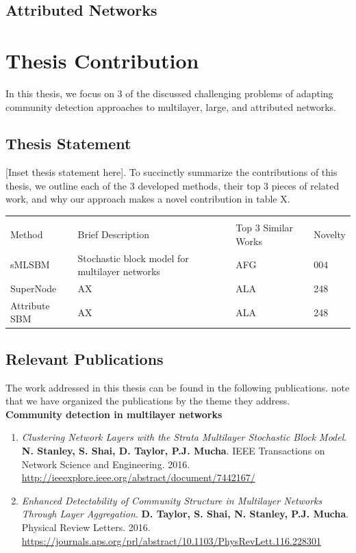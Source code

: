 \subsection{Attributed Networks}

\section{Thesis Contribution}
In this thesis, we focus on 3 of the discussed challenging problems of adapting community detection approaches to multilayer, large, and attributed networks. 

\subsection{Thesis Statement}

[Inset thesis statement here]. To succinctly summarize the contributions of this thesis, we outline each of the 3 developed methods, their top 3 pieces of related work, and why our approach makes a novel contribution in table X. 

\begin{tabular}{ p{3cm}||p{3cm}|p{3cm}|p{3cm} }
 \multicolumn{4}{c}{} \\
 Method& Brief Description & Top 3 Similar Works & Novelty\\
 \hline
sMLSBM   & Stochastic block model for multilayer networks    &AFG&   004\\
SuperNode&   AX  & ALA   &248\\
Attribute SBM&   AX  & ALA   &248\\
 \hline
\end{tabular}

\subsection{Relevant Publications}
The work addressed in this thesis can be found in the following publications. note that we have organized the publications by the theme they address. \\

{\bf Community detection in multilayer networks}
\begin{enumerate}
\item \emph{Clustering Network Layers with the Strata Multilayer Stochastic Block Model}. {\bf N. Stanley, S. Shai, D. Taylor, P.J. Mucha}. IEEE Transactions on Network Science and Engineering. 2016. \url{http://ieeexplore.ieee.org/abstract/document/7442167/}
\item \emph{Enhanced Detectability of Community Structure in Multilayer Networks Through Layer Aggregation}. {\bf D. Taylor, S. Shai, N. Stanley, P.J. Mucha}. Physical Review Letters. 2016. \url{https://journals.aps.org/prl/abstract/10.1103/PhysRevLett.116.228301}
\end{enumerate}

